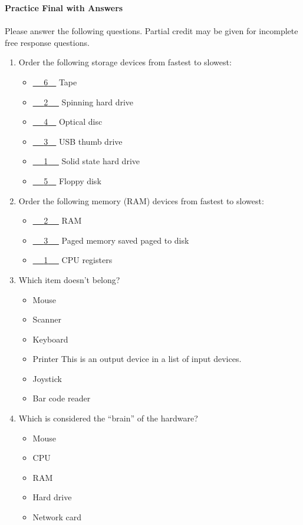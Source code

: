 \documentclass[letter,11pt]{article}
\newcommand*\tick{\item[\Checkmark]}
\newcommand*\fail{\item[\XSolidBrush]}
\begin{document}
\huge
\textbf{Practice Final with Answers}
\normalsize

\paragraph{}Please answer the following questions. Partial credit may be given for incomplete free response questions.

\begin{enumerate}
    \item Order the following storage devices from fastest to slowest:
    \begin{itemize}
        \item \underline{~~ {\color{red}6}~~} Tape
        \item \underline{~~ {\color{red}2} ~~} Spinning hard drive
        \item \underline{~~ {\color{red}4}~~} Optical disc
        \item \underline{~~ {\color{red}3}~~} USB thumb drive
        \item \underline{~~ {\color{red}1} ~~} Solid state hard drive
        \item \underline{~~ {\color{red}5}~~} Floppy disk
    \end{itemize}
    
    \item Order the following memory (RAM) devices from fastest to slowest:
    \begin{itemize}
        \item \underline{~~ {\color{red}2} ~~} RAM
        \item \underline{~~ {\color{red}3} ~~} Paged memory saved paged to disk
        \item \underline{~~ {\color{red}1} ~~} CPU registers
    \end{itemize}
    
    \item Which item doesn't belong?
    \begin{itemize}
        \fail Mouse
        \fail Scanner
        \fail Keyboard
        \tick Printer {\color{red}This is an output device in a list of input devices.}
        \fail Joystick
        \fail Bar code reader
    \end{itemize}
    
    \item Which is considered the ``brain'' of the hardware?
    \begin{itemize}
        \fail Mouse
        \tick CPU
        \fail RAM
        \fail Hard drive
        \fail Network card
    \end{itemize}
    

\end{enumerate}
\end{document}
